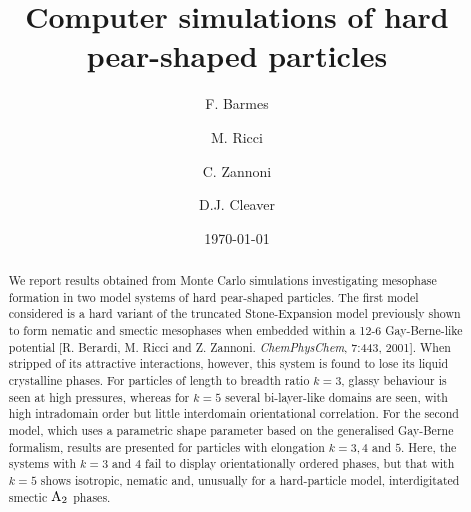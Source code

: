 \documentclass[%
reprint,
superscriptaddress,
showpacs,
 amsmath,amssymb,
 aps,
floatfix,
]{revtex4-1}
\begin{document}
\graphicspath
{
{../imgs/}
}

\title{Computer simulations of hard pear-shaped particles}

\author{F. Barmes}

\author{M. Ricci}
\author{C. Zannoni}

\author{D.J. Cleaver}






\date{\today}


\begin{abstract}
We report results obtained from Monte Carlo simulations
investigating mesophase formation in two model systems of hard
pear-shaped particles. The first model considered is a hard
variant of the truncated Stone-Expansion model previously shown to
form nematic and smectic mesophases when embedded within a 12-6
Gay-Berne-like potential 
[R. Berardi, M. Ricci and Z. Zannoni. \emph{ChemPhysChem}, 7:443, 2001]. 
When stripped of
its attractive interactions, however, this system is found to lose
its liquid crystalline phases. For particles of length to breadth
ratio $k=3$, glassy behaviour is seen at high pressures, whereas
for $k=5$ several bi-layer-like domains are seen, with high
intradomain order but little interdomain orientational
correlation. For the second model, which uses a parametric shape
parameter based on the generalised Gay-Berne formalism, results
are presented for particles with elongation $k=3,4$ and $5$. Here,
the systems with $k=3$ and $4$ fail to display orientationally
ordered phases, but that with $k=5$ shows isotropic, nematic and,
unusually for a hard-particle model, interdigitated smectic ${\rm
A_2}$ phases.
\end{abstract}

\maketitle
\end{document}
